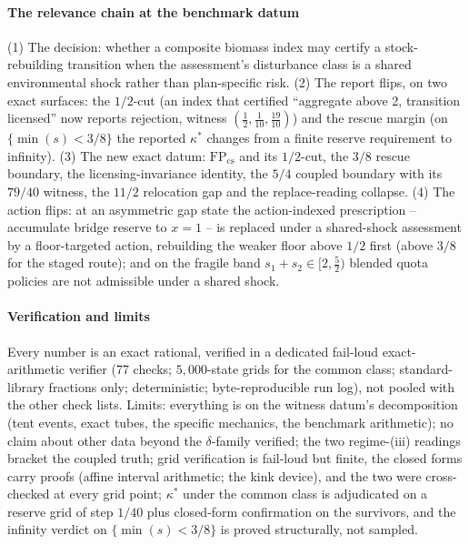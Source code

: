 \paragraph{The relevance chain at the benchmark datum} (1) The decision: whether a composite biomass index may certify a stock-rebuilding transition when the assessment's disturbance class is a shared environmental shock rather than plan-specific risk. (2) The report flips, on two exact surfaces: the $1/2$-cut (an index that certified ``aggregate above 2, transition licensed'' now reports rejection, witness $(\tfrac12,\tfrac1{10},\tfrac{19}{10})$) and the rescue margin (on $\{\min(s)<3/8\}$ the reported $\kappa^*$ changes from a finite reserve requirement to infinity). (3) The new exact datum: $\mathrm{FP}_{\mathrm{cs}}$ and its $1/2$-cut, the $3/8$ rescue boundary, the licensing-invariance identity, the $5/4$ coupled boundary with its $79/40$ witness, the $11/2$ relocation gap and the replace-reading collapse. (4) The action flips: at an asymmetric gap state the action-indexed prescription -- accumulate bridge reserve to $x=1$ -- is replaced under a shared-shock assessment by a floor-targeted action, rebuilding the weaker floor above $1/2$ first (above $3/8$ for the staged route); and on the fragile band $s_1+s_2\in[2,\tfrac52)$ blended quota policies are not admissible under a shared shock.

\paragraph{Verification and limits} Every number is an exact rational, verified in a dedicated fail-loud exact-arithmetic verifier (77 checks; $5{,}000$-state grids for the common class; standard-library fractions only; deterministic; byte-reproducible run log), not pooled with the other check lists. Limits: everything is on the witness datum's decomposition (tent events, exact tubes, the specific  mechanics, the benchmark arithmetic); no claim about other data beyond the $\delta$-family verified; the two regime-(iii) readings bracket the coupled truth; grid verification is fail-loud but finite, the closed forms carry proofs (affine interval arithmetic; the kink device), and the two were cross-checked at every grid point; $\kappa^*$ under the common class is adjudicated on a reserve grid of step $1/40$ plus closed-form confirmation on the survivors, and the infinity verdict on $\{\min(s)<3/8\}$ is proved structurally, not sampled.

